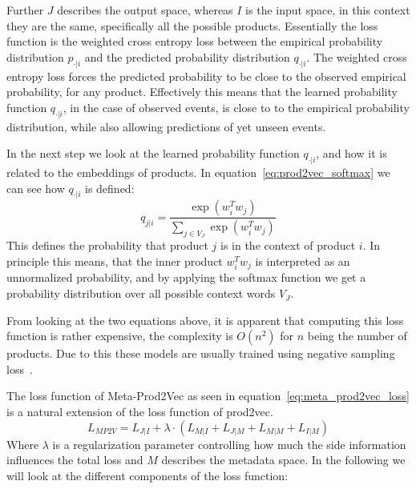 Further $J$ describes the output space, whereas $I$ is the input space, in this context they are the same, specifically all the possible products.
Essentially the loss function is the weighted cross entropy loss between the empirical probability distribution $p_{\cdot|i}$ and the predicted probability distribution $q_{\cdot|i}$.
The weighted cross entropy loss forces the predicted probability to be close to the observed empirical probability, for any product.
Effectively this means that the learned probability function $q_{\cdot|i}$, in the case of observed events, is close to to the empirical probability distribution, while also allowing predictions of yet unseen events.
\par
In the next step we look at the learned probability function $q_{\cdot|i}$, and how it is related to the embeddings of products.
In equation~\ref{eq:prod2vec_softmax} we can see how $q_{\cdot|i}$ is defined:
\begin{equation}\label{eq:prod2vec_softmax}
    q_{j|i} = \frac{\exp(w_i^Tw_j)}{\sum_{j \in V_J} \exp(w_i^Tw_{j})}
\end{equation}
This defines the probability that product $j$ is in the context of product $i$.
In principle this means, that the inner product $w_i^Tw_j$ is interpreted as an unnormalized probability, and by applying the softmax function we get a probability distribution over all possible context words $V_J$.
\par
From looking at the two equations above, it is apparent that computing this loss function is rather expensive, the complexity is $O(n^2)$ for $n$ being the number of products.
Due to this these models are usually trained using negative sampling loss~\cite{neg_sampling}.
\par
The loss function of Meta-Prod2Vec as seen in equation~\ref{eq:meta_prod2vec_loss} is a natural extension of the loss function of prod2vec.
\begin{equation}\label{eq:meta_prod2vec_loss}
    L_{MP2V} = L_{J|I} + \lambda \cdot (L_{M|I} + L_{J|M} + L_{M|M} + L_{I|M})
\end{equation}
Where $\lambda$ is a regularization parameter controlling how much the side information influences the total loss and $M$ describes the metadata space.
In the following we will look at the different components of the loss function:
